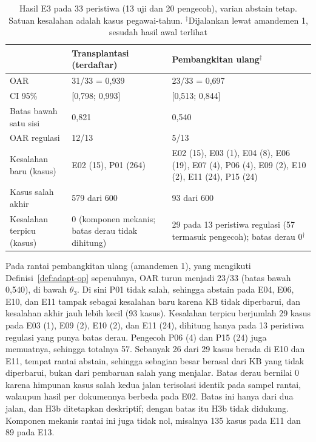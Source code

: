 \documentclass[journal,a4paper]{IEEEtran}
\makeatletter
\DeclareRobustCommand{\en}[1]{{\usefont{\f@encoding}{\f@family}{\f@series}{it}#1\/}}
\makeatother
\begin{document}
\begin{table}[t]
\centering
\caption{Hasil E3 pada 33 peristiwa (13 uji dan 20 pengecoh), varian \en{abstain} tetap. Satuan kesalahan adalah kasus pegawai-tahun. $^\dagger$Dijalankan lewat amandemen 1, sesudah hasil awal terlihat}
\label{tab:e3}
\scriptsize
\setlength{\tabcolsep}{3pt}
\begin{tabularx}{\columnwidth}{@{}L P{1.75cm} P{2.45cm}@{}}
\toprule
& \textbf{Transplantasi (terdaftar)} & \textbf{Pembangkitan ulang$^\dagger$} \\
\midrule
OAR & 31/33 = 0,939 & 23/33 = 0,697 \\
CI 95\% & [0,798; 0,993] & [0,513; 0,844] \\
Batas bawah satu sisi & 0,821 & 0,540 \\
OAR regulasi & 12/13 & 5/13 \\
Kesalahan baru (kasus) & E02 (15), P01 (264) & E02 (15), E03 (1), E04 (8), E06 (19), E07 (4), P06 (4), E09 (2), E10 (2), E11 (24), P15 (24) \\
Kasus salah akhir & 579 dari 600 & 93 dari 600 \\
Kesalahan terpicu (kasus) & 0 (komponen mekanis; batas derau tidak dihitung) & 29 pada 13 peristiwa regulasi (57 termasuk pengecoh); batas derau 0$^\dagger$ \\
\bottomrule
\end{tabularx}
\end{table}

Pada rantai pembangkitan ulang (amandemen 1), yang mengikuti Definisi~\ref{def:adapt-op} sepenuhnya, OAR turun menjadi 23/33 (batas bawah 0,540), di bawah $\theta_3$. Di sini P01 tidak salah, sehingga \en{abstain} pada E04, E06, E10, dan E11 tampak sebagai kesalahan baru karena KB tidak diperbarui, dan kesalahan akhir jauh lebih kecil (93 kasus). Kesalahan terpicu berjumlah 29 kasus pada E03 (1), E09 (2), E10 (2), dan E11 (24), dihitung hanya pada 13 peristiwa regulasi yang punya batas derau. Pengecoh P06 (4) dan P15 (24) juga memuatnya, sehingga totalnya 57. Sebanyak 26 dari 29 kasus berada di E10 dan E11, tempat rantai \en{abstain}, sehingga sebagian besar berasal dari KB yang tidak diperbarui, bukan dari pembaruan salah yang menjalar. Batas derau bernilai 0 karena himpunan kasus salah kedua jalan terisolasi identik pada sampel rantai, walaupun hasil per dokumennya berbeda pada E02. Batas ini hanya dari dua jalan, dan H3b ditetapkan deskriptif; dengan batas itu H3b tidak didukung. Komponen mekanis rantai ini juga tidak nol, misalnya 135 kasus pada E11 dan 89 pada E13.
\end{document}
